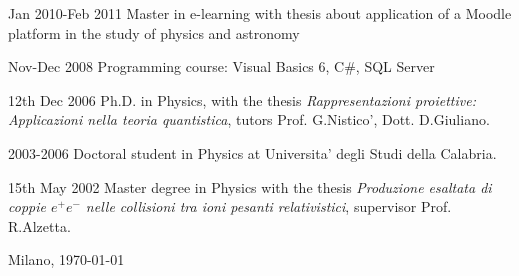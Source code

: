 \begin{CV}
	\item[Jan 2010-Feb 2011] Master in e-learning with thesis about application of a Moodle platform in the study of physics and astronomy
	
	\item[Nov-Dec 2008] Programming course: Visual Basics 6, C\#, SQL Server
	
	\item[12th Dec 2006] Ph.D. in Physics, with the thesis {\em Rappresentazioni proiettive: Applicazioni nella teoria quantistica}, tutors Prof. G.Nistico', Dott. D.Giuliano.
	
	\item[2003-2006] Doctoral student in Physics at Universita' degli Studi della Calabria.
	
	\item[15th May 2002] Master degree in Physics with the thesis {\em Produzione esaltata di coppie $e^+ e^-$ nelle collisioni tra ioni pesanti relativistici}, supervisor Prof. R.Alzetta.
\end{CV}
%
%
%
\vspace{2\baselineskip}
\noindent Milano, \today